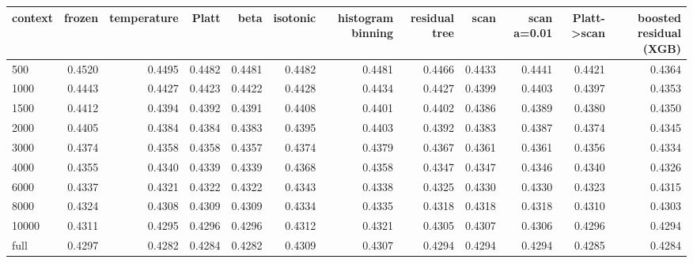 \begin{tabular}{lrrrrrrrrrrr}
\toprule
context & frozen & temperature & Platt & beta & isotonic & histogram binning & residual tree & scan & scan a=0.01 & Platt->scan & boosted residual (XGB) \\
\midrule
500 & 0.4520 & 0.4495 & 0.4482 & 0.4481 & 0.4482 & 0.4481 & 0.4466 & 0.4433 & 0.4441 & 0.4421 & 0.4364 \\
1000 & 0.4443 & 0.4427 & 0.4423 & 0.4422 & 0.4428 & 0.4434 & 0.4427 & 0.4399 & 0.4403 & 0.4397 & 0.4353 \\
1500 & 0.4412 & 0.4394 & 0.4392 & 0.4391 & 0.4408 & 0.4401 & 0.4402 & 0.4386 & 0.4389 & 0.4380 & 0.4350 \\
2000 & 0.4405 & 0.4384 & 0.4384 & 0.4383 & 0.4395 & 0.4403 & 0.4392 & 0.4383 & 0.4387 & 0.4374 & 0.4345 \\
3000 & 0.4374 & 0.4358 & 0.4358 & 0.4357 & 0.4374 & 0.4379 & 0.4367 & 0.4361 & 0.4361 & 0.4356 & 0.4334 \\
4000 & 0.4355 & 0.4340 & 0.4339 & 0.4339 & 0.4368 & 0.4358 & 0.4347 & 0.4347 & 0.4346 & 0.4340 & 0.4326 \\
6000 & 0.4337 & 0.4321 & 0.4322 & 0.4322 & 0.4343 & 0.4338 & 0.4325 & 0.4330 & 0.4330 & 0.4323 & 0.4315 \\
8000 & 0.4324 & 0.4308 & 0.4309 & 0.4309 & 0.4334 & 0.4335 & 0.4318 & 0.4318 & 0.4318 & 0.4310 & 0.4303 \\
10000 & 0.4311 & 0.4295 & 0.4296 & 0.4296 & 0.4312 & 0.4321 & 0.4305 & 0.4307 & 0.4306 & 0.4296 & 0.4294 \\
full & 0.4297 & 0.4282 & 0.4284 & 0.4282 & 0.4309 & 0.4307 & 0.4294 & 0.4294 & 0.4294 & 0.4285 & 0.4284 \\
\bottomrule
\end{tabular}
